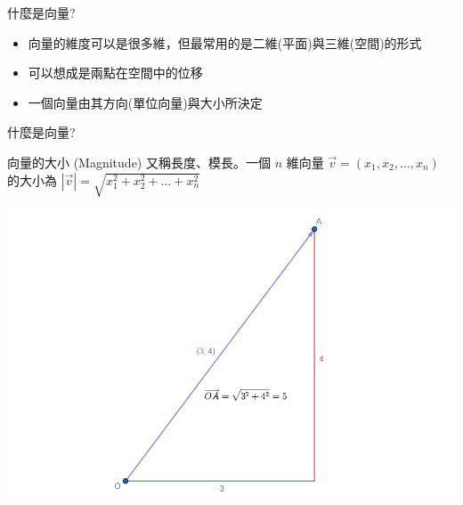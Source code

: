 \documentclass[aspectratio=169]{beamer}
\begin{document}
\begin{frame}{什麼是向量?}
    \begin{itemize}
        \item 向量的維度可以是很多維，但最常用的是二維(平面)與三維(空間)的形式
        \item 可以想成是兩點在空間中的位移
        \item 一個向量由其方向(單位向量)與大小所決定
    \end{itemize}
\end{frame}

\begin{frame}{什麼是向量?}
    \begin{alertblock}{向量的大小 (Magnitude)}
        又稱長度、模長。一個 $n$ 維向量 $\vec v = (x_1,x_2,\dots,x_n)$ 的大小為 $|\vec v| = \sqrt{x_1^2+x_2^2+\dots+x_n^2}$
    \end{alertblock}
    \begin{center}
        \includegraphics[scale=0.3]{images/magnitude.png}
    \end{center}
\end{frame}
\end{document}

